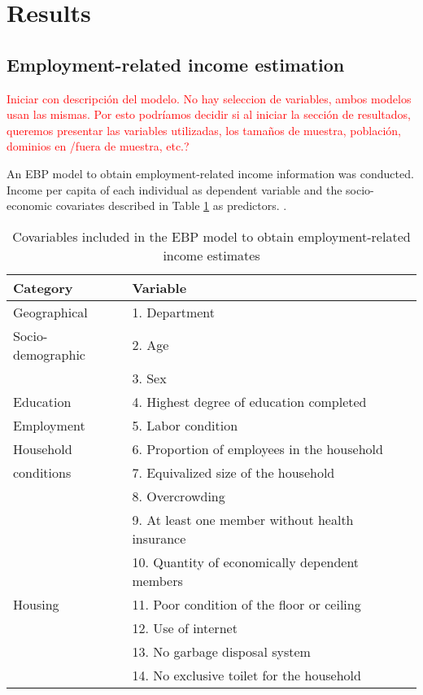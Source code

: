 \documentclass[a4paper, 11pt]{article}
\begin{document}
\section{Results}


\subsection{Employment-related income estimation}

\textcolor{red}{Iniciar con descripción del modelo. No hay seleccion de variables, ambos modelos usan las mismas. Por esto podríamos decidir si al iniciar la sección de resultados, queremos presentar las variables utilizadas, los tamaños de muestra, población, dominios en /fuera de muestra, etc.?}


An EBP model to obtain employment-related income information was conducted. Income per capita of each individual as dependent variable and the socio-economic covariates described in Table \ref{tab:variables} as predictors. . 

\begin{table}[ht!] 
\begin{center}
  \begin{threeparttable} 
	\centering
\small{
	\caption{Covariables included in the EBP model to obtain employment-related income estimates} \label{tab:variables}
		\begin{tabular}{ll}
		\hline
		Category& Variable \\
		\hline
				 Geographical & 1. Department \\
		 	Socio-demographic 	& 2. Age \\
				& 3. Sex \\
			Education	& 4. Highest degree of education completed   \\
			Employment	& 5. Labor condition \\
			Household 	& 6. Proportion of employees in the household \\
			 conditions& 7. Equivalized size of the household \\
			 	& 8. Overcrowding \\
				& 9. At least one member without health insurance \\		
				& 10. Quantity of economically dependent members\\
				Housing & 11. Poor condition of the floor or ceiling \\
				& 12. Use of internet\\
				 & 13. No garbage disposal system \\
				 & 14. No exclusive toilet for the household \\
			\hline
	\end{tabular}
	}
  \end{threeparttable}
  \end{center}
\end{table}
\end{document}
